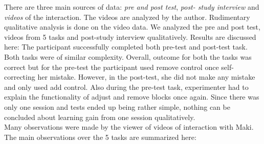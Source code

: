 There are three main sources of data: \textit{pre and post test}, \textit{post- study interview} and \textit{videos} of the interaction. The videos are analyzed by the author. Rudimentary qualitative analysis is done on the video data. We analyzed the pre and post test, videos from 5 tasks and post-study interview qualitatively. Results are discussed here:
The participant successfully completed both pre-test and post-test task. Both tasks were of similar complexity. Overall, outcome for both the tasks was correct but for the pre-test the participant used remove control once self-correcting her mistake. However, in the post-test, she did not make any mistake and only used add control. Also during the pre-test task, experimenter had to explain the functionality of adjust and remove blocks once again. Since there was only one session and tests ended up being rather simple, nothing can be concluded about learning gain from one session qualitatively. \\
Many observations were made by the viewer of videos of interaction with Maki. The main observations over the 5 tasks are summarized here: 
